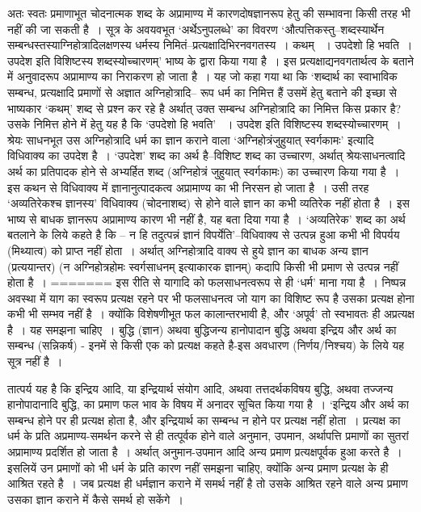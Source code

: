 अतः स्वतः प्रमाणाभूत चोदनात्मक शब्द के अप्रामाण्य में कारणदोषज्ञानरूप हेतु की सम्भावना किसी तरह भी नहीं की जा सकती है~। सूत्र के अवयवभूत ‘अर्थेऽनुपलब्धे' का विवरण ‘औत्पत्तिकस्तु–शब्दस्यार्थेन सम्बन्धस्तस्याग्निहोत्रादिलक्षणस्य धर्मस्य निमितं–प्रत्यक्षादिभिरनवगतस्य~। कथम् ~। उपदेशो हि भवति~। उपदेश इति विशिष्टस्य शब्दस्योच्चारणम्' भाष्य के द्वारा किया गया है~। इस प्रत्यक्षाद्यनवगतार्थत्व के बताने में अनुवादरूप अप्रामाण्य का निराकरण हो जाता है~। यह जो कहा गया था कि ‘शब्दार्थ का स्वाभाविक सम्बन्ध, प्रत्यक्षादि प्रमाणों से अज्ञात अग्निहोत्रादि– रूप धर्म का निमित्त हैं उसमें हेतु बताने की इच्छा से भाष्यकार ‘कथम्' शब्द से प्रश्न कर रहे है अर्थात् उक्त सम्बन्ध अग्निहोत्रादि का निमित्त किस प्रकार है? उसके निमित्त होने में हेतु यह है कि ‘उपदेशो हि भवति' ~। उपदेश इति विशिष्टस्य शब्दस्योच्चारणम्~। श्रेयः साधनभूत उस अग्निहोत्रादि धर्म का ज्ञान कराने वाला ‘अग्निहोत्रंजुहुयात् स्वर्गकामः' इत्यादि विधिवाक्य का उपदेश है~। ‘उपदेश' शब्द का अर्थ है–विशिष्ट शब्द का उच्चारण, अर्थात् श्रेयःसाधनत्वादि अर्थ का प्रतिपादक होने से अभ्यर्हित शब्द (अग्निहोत्रं जुहुयात् स्वर्गकामः) का उच्चारण किया गया है~। इस कथन से विधिवाक्य में ज्ञानानुत्पादकत्व अप्रामाण्य का भी निरसन हो जाता है~। उसी तरह ‘अव्यतिरेकश्च ज्ञानस्य' विधिवाक्य (चोदनाशब्द) से होने वाले ज्ञान का कभी व्यतिरेक नहीं होता है~। इस भाष्य से बाधक ज्ञानरूप अप्रामाण्य कारण भी नहीं है, यह बता दिया गया है~। ‘अव्यतिरेक' शब्द का अर्थ बतलाने के लिये कहते है कि – न हि तदुत्पन्नं ज्ञानं विपर्येति'–विधिवाक्य से उत्पन्न हुआ कभी भी विपर्यय (मिथ्यात्व) को प्राप्त नहीं होता~। अर्थात् अग्निहोत्रादि वाक्य से हुये ज्ञान का बाधक अन्य ज्ञान (प्रत्ययान्तर) (न अग्निहोत्रहोमः स्वर्गसाधनम् इत्याकारक ज्ञानम्) कदापि किसी भी प्रमाण से उत्पन्न नहीं होता है~। 
=======
इस रीति से यागादि को फलसाधनत्वरूप से ही ‘धर्म' माना गया है~। निष्पन्न अवस्था में याग का स्वरूप प्रत्यक्ष रहने पर भी फलसाधनत्व जो याग का विशिष्ट रूप है उसका प्रत्यक्ष होना कभी भी सम्भव नहीं है~। क्योंकि विशेषणीभूत फल कालान्तरभावी है, और ‘अपूर्व' तो स्वभावतः ही अप्रत्यक्ष है~। यह समझना चाहिए~। बुद्धि (ज्ञान) अथवा बुद्धिजन्य हानोपादान बुद्धि अथवा इन्द्रिय और अर्थ का सम्बन्ध (सन्निकर्ष) - इनमें से किसी एक को प्रत्यक्ष कहते है-इस अवधारण (निर्णय/निश्चय) के लिये यह सूत्र नहीं है~। 

तात्पर्य यह है कि इन्द्रिय आदि, या इन्द्रियार्थ संयोग आदि, अथवा तत्तदर्थकविषय बुद्धि, अथवा तज्जन्य हानोपादानादि बुद्धि, का प्रमाण फल भाव के विषय में अनादर सूचित किया गया है~। ‘इन्द्रिय और अर्थ का सम्बन्ध होने पर ही प्रत्यक्ष होता है, और इन्द्रियार्थ का सम्बन्ध न होने पर प्रत्यक्ष नहीं होता~। प्रत्यक्ष का धर्म के प्रति अप्रमाण्य-समर्थन करने से ही तत्पूर्वक होने वाले अनुमान, उपमान, अर्थापत्ति प्रमाणों का सुतरां अप्रामाण्य प्रदर्शित हो जाता है~। अर्थात् अनुमान-उपमान आदि अन्य प्रमाण प्रत्यक्षपूर्वक हुआ करते है~। इसलियें उन प्रमाणों को भी धर्म के प्रति कारण नहीं समझना चाहिए, क्योंकि अन्य प्रमाण प्रत्यक्ष के ही आश्रित रहते है~। जब प्रत्यक्ष ही धर्मज्ञान कराने में समर्थ नहीं है तो उसके आश्रित रहने वाले अन्य प्रमाण उसका ज्ञान कराने में कैसे समर्थ हो सकेंगे~। 


